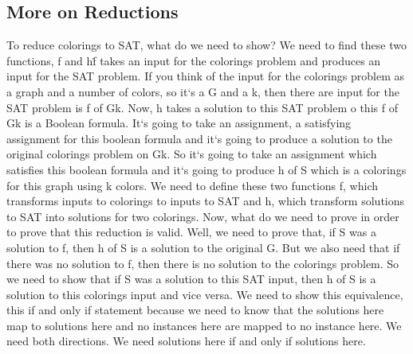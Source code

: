 \subsection{More on Reductions}
To reduce colorings to SAT, what do we need to show? We need to find these two functions, f and h\. f takes an input for the colorings problem and produces an input for the SAT problem.
If you think of the input for the colorings problem as a graph and a number of colors, so it`s a G and a k, then there are input for the SAT problem is f of Gk.
Now, h takes a solution to this SAT problem o this f of Gk is a Boolean formula.
It`s going to take an assignment, a satisfying assignment for this boolean formula and it`s going to produce a solution to the original colorings problem on Gk.
So it`s going to take an assignment which satisfies this boolean formula and it`s going to produce h of S which is a colorings for this graph using k colors.
We need to define these two functions f, which transforms inputs to colorings to inputs to SAT and h, which transform solutions to SAT into solutions for two colorings.
Now, what do we need to prove in order to prove that this reduction is valid.
Well, we need to prove that, if S was a solution to f, then h of S is a solution to the original G\@.
But we also need that if there was no solution to f, then there is no solution to the colorings problem.
So we need to show that if S was a solution to this SAT input, then h of S is a solution to this colorings input and vice versa.
We need to show this equivalence, this if and only if statement because we need to know that the solutions here map to solutions here and no instances here are mapped to no instance here.
We need both directions.
We need solutions here if and only if solutions here.

